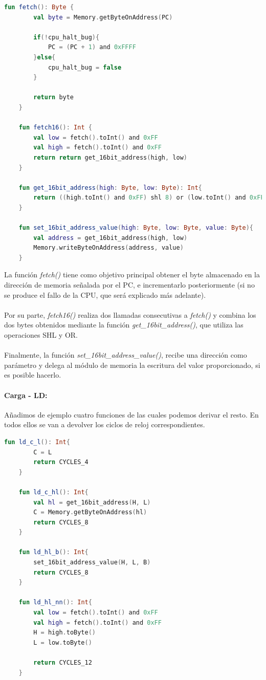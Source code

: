 \begin{lstlisting}[language=Kotlin, caption={Operaciones comunes}, label={code:kotlincommon}]
    fun fetch(): Byte {
        val byte = Memory.getByteOnAddress(PC)

        if(!cpu_halt_bug){
            PC = (PC + 1) and 0xFFFF
        }else{
            cpu_halt_bug = false
        }

        return byte
    }

    fun fetch16(): Int {
        val low = fetch().toInt() and 0xFF
        val high = fetch().toInt() and 0xFF
        return return get_16bit_address(high, low)
    }

    fun get_16bit_address(high: Byte, low: Byte): Int{
        return ((high.toInt() and 0xFF) shl 8) or (low.toInt() and 0xFF)
    }

    fun set_16bit_address_value(high: Byte, low: Byte, value: Byte){
        val address = get_16bit_address(high, low)
        Memory.writeByteOnAddress(address, value)
    }
\end{lstlisting}

La función \textit{fetch()} tiene como objetivo principal obtener el byte almacenado en la dirección de memoria señalada por el PC, e incrementarlo posteriormente (si no se produce el fallo de la CPU, que será explicado más adelante). 
\\\\
Por su parte, \textit{fetch16()} realiza dos llamadas consecutivas a \textit{fetch()} y combina los dos bytes obtenidos mediante la función \textit{get\_16bit\_address()}, que utiliza las operaciones SHL y OR. 
\\\\
Finalmente, la función \textit{set\_16bit\_address\_value()}, recibe una dirección como parámetro y delega al módulo de memoria la escritura del valor proporcionado, si es posible hacerlo.

\paragraph{Carga - LD:}\label{instrLd}

Añadimos de ejemplo cuatro funciones de las cuales podemos derivar el resto. En todos ellos se van a devolver los ciclos de reloj correspondientes.

\begin{lstlisting}[language=Kotlin, caption={Operaciones LD}, label={code:kotlinld}]
    fun ld_c_l(): Int{
        C = L
        return CYCLES_4
    }

    fun ld_c_hl(): Int{
        val hl = get_16bit_address(H, L)
        C = Memory.getByteOnAddress(hl)
        return CYCLES_8
    }

    fun ld_hl_b(): Int{
        set_16bit_address_value(H, L, B)
        return CYCLES_8
    }

    fun ld_hl_nn(): Int{
        val low = fetch().toInt() and 0xFF
        val high = fetch().toInt() and 0xFF
        H = high.toByte()
        L = low.toByte()

        return CYCLES_12
    }
\end{lstlisting}

